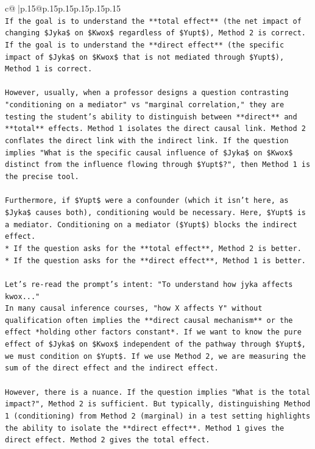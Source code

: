 \documentclass{article}
\begin{document}
{\begin{supertabular}{c@{$\;$}|p{.15\linewidth}@{}p{.15\linewidth}p{.15\linewidth}p{.15\linewidth}p{.15\linewidth}p{.15\linewidth}}
{{{\\ 
\texttt{If the goal is to understand the **total effect** (the net impact of changing \$Jyka\$ on \$Kwox\$ regardless of \$Yupt\$), Method 2 is correct.} \\
\texttt{If the goal is to understand the **direct effect** (the specific impact of \$Jyka\$ on \$Kwox\$ that is not mediated through \$Yupt\$), Method 1 is correct.} \\
\\ 
\texttt{However, usually, when a professor designs a question contrasting "conditioning on a mediator" vs "marginal correlation," they are testing the student's ability to distinguish between **direct** and **total** effects. Method 1 isolates the direct causal link. Method 2 conflates the direct link with the indirect link. If the question implies "What is the specific causal influence of \$Jyka\$ on \$Kwox\$ distinct from the influence flowing through \$Yupt\$?", then Method 1 is the precise tool.} \\
\\ 
\texttt{Furthermore, if \$Yupt\$ were a confounder (which it isn't here, as \$Jyka\$ causes both), conditioning would be necessary. Here, \$Yupt\$ is a mediator. Conditioning on a mediator (\$Yupt\$) blocks the indirect effect.} \\
\texttt{*   If the question asks for the **total effect**, Method 2 is better.} \\
\texttt{*   If the question asks for the **direct effect**, Method 1 is better.} \\
\\ 
\texttt{Let's re{-}read the prompt's intent: "To understand how jyka affects kwox..."} \\
\texttt{In many causal inference courses, "how X affects Y" without qualification often implies the **direct causal mechanism** or the effect *holding other factors constant*. If we want to know the pure effect of \$Jyka\$ on \$Kwox\$ independent of the pathway through \$Yupt\$, we must condition on \$Yupt\$. If we use Method 2, we are measuring the sum of the direct effect and the indirect effect.} \\
\\ 
\texttt{However, there is a nuance. If the question implies "What is the total impact?", Method 2 is sufficient. But typically, distinguishing Method 1 (conditioning) from Method 2 (marginal) in a test setting highlights the ability to isolate the **direct effect**. Method 1 gives the direct effect. Method 2 gives the total effect.} \\
}}}
\end{supertabular}}
\end{document}
